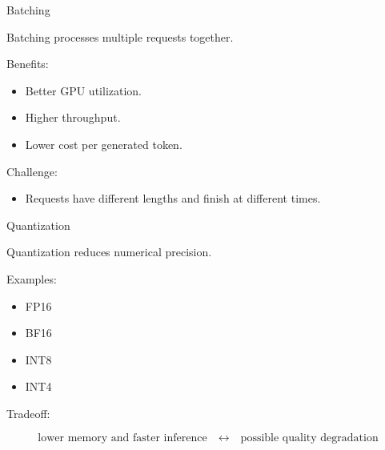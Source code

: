 \documentclass[aspectratio=169]{beamer}
\begin{document}
\begin{frame}{Batching}

Batching processes multiple requests together.

\vspace{0.4cm}

Benefits:

\begin{itemize}
    \item Better GPU utilization.
    \item Higher throughput.
    \item Lower cost per generated token.
\end{itemize}

\vspace{0.4cm}

Challenge:

\begin{itemize}
    \item Requests have different lengths and finish at different times.
\end{itemize}

\end{frame}

\begin{frame}{Quantization}

Quantization reduces numerical precision.

\vspace{0.4cm}

Examples:

\begin{itemize}
    \item FP16
    \item BF16
    \item INT8
    \item INT4
\end{itemize}

\vspace{0.4cm}

Tradeoff:

\[
\text{lower memory and faster inference}
\quad
\leftrightarrow
\quad
\text{possible quality degradation}
\]

\end{frame}
\end{document}
